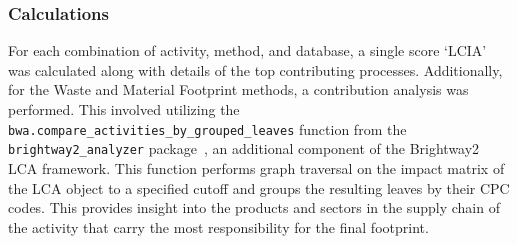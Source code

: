 \subsubsection{Calculations}
For each combination of activity, method, and database, a single score `LCIA' was calculated along with details of the top contributing processes. Additionally, for the Waste and Material Footprint methods, a contribution analysis was performed. This involved utilizing the \texttt{bwa.compare\_activities\_by\_grouped\_leaves} function from the \texttt{brightway2\_analyzer} package~\citep{mutel2016brightway2analyzer}, an additional component of the Brightway2 LCA framework. This function performs graph traversal on the impact matrix of the LCA object to a specified cutoff and groups the resulting leaves by their CPC codes. This provides insight into the products and sectors in the supply chain of the activity that carry the most responsibility for the final footprint.


